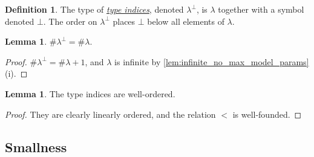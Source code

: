 \documentclass{article}
\newcommand{\cdef}[3]{\href{https://leanprover-community.github.io/con-nf/doc/ConNF/#1.html\#ConNF.#2}{\emph{#3}}}
\theoremstyle{definition}
\newtheorem{definition}{Definition}[section]
\newtheorem{lemma}[theorem]{Lemma}
\theoremstyle{remark}
\begin{document}
\begin{definition}
    The type of \cdef{Atom/Params}{TypeIndex}{type indices}, denoted \( \lambda^\bot \), is \( \lambda \) together with a symbol denoted \( \bot \).
    The order on \( \lambda^\bot \) places \( \bot \) below all elements of \( \lambda \).
\end{definition}
\begin{lemma}
    \label{lem:mk_typeIndex}
    \( \#\lambda^\bot = \#\lambda \).
\end{lemma}
\begin{proof}
    \( \#\lambda^\bot = \#\lambda + 1 \), and \( \lambda \) is infinite by \cref{lem:infinite_no_max_model_params}(i).
\end{proof}
\begin{lemma}
    \label{lem:typeIndex_wf}
    The type indices are well-ordered.
\end{lemma}
\begin{proof}
    They are clearly linearly ordered, and the relation \( < \) is well-founded.
\end{proof}

\subsection{Smallness}
\end{document}
